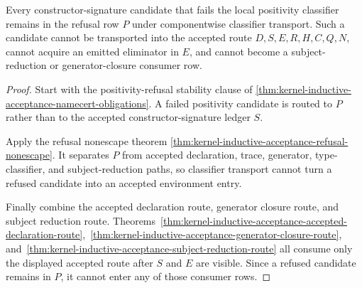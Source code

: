 \begin{theorem}
\label{thm:kernel-inductive-acceptance-positivity-refusal-classifier-stability}
Every constructor-signature candidate that fails the local positivity classifier remains in the refusal row $P$ under componentwise classifier transport. Such a candidate cannot be transported into the accepted route $D,S,E,R,H,C,Q,N$, cannot acquire an emitted eliminator in $E$, and cannot become a subject-reduction or generator-closure consumer row.
\end{theorem}
\begin{proof}
Start with the positivity-refusal stability clause of \autoref{thm:kernel-inductive-acceptance-namecert-obligations}. A failed positivity candidate is routed to $P$ rather than to the accepted constructor-signature ledger $S$.

Apply the refusal nonescape theorem \autoref{thm:kernel-inductive-acceptance-refusal-nonescape}. It separates $P$ from accepted declaration, trace, generator, type-classifier, and subject-reduction paths, so classifier transport cannot turn a refused candidate into an accepted environment entry.

Finally combine the accepted declaration route, generator closure route, and subject reduction route. Theorems~\ref{thm:kernel-inductive-acceptance-accepted-declaration-route},~\ref{thm:kernel-inductive-acceptance-generator-closure-route}, and~\ref{thm:kernel-inductive-acceptance-subject-reduction-route} all consume only the displayed accepted route after $S$ and $E$ are visible. Since a refused candidate remains in $P$, it cannot enter any of those consumer rows.
\end{proof}

